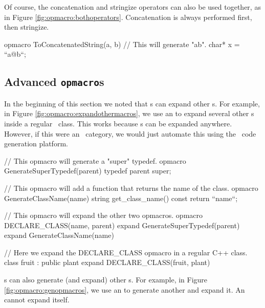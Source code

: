 {Of course, the concatenation and stringize operators can also be used together, as in Figure \ref{fig:opmacro:bothoperators}.  Concatenation is always performed first, then stringize.

\begin{opcpp}[label={fig:opmacro:bothoperators},caption={Using the concatenation and stringize operators together.}]
opmacro ToConcatenatedString(a, b)
{
    // This will generate "ab".    
    char* x = ``a@b``;
}
\end{opcpp}

\subsection{Advanced {\tt opmacro}s}
\label{subsec:advancedopmacros}

In the beginning of this section we noted that s can expand other s.  For example, in Figure \ref{fig:opmacro:expandothermacros}, we use an  to expand several other s inside a regular \cpp\ class.  This works because s can be expanded anywhere.  However, if this were an \opCPP\ category, we would just automate this using the \opCPP\ code generation platform.

\begin{opcpp}[label={fig:opmacro:expandothermacros},caption={Using an \opcppk{opmacro} to expand other \opcppk{opmacro}s.}]
// This opmacro will generate a "super" typedef.
opmacro GenerateSuperTypedef(parent)
{
    typedef parent super;
}

// This opmacro will add a function that returns the name of the class.
opmacro GenerateClassName(name)
{
    string get_class_name() const
    {
        return ``name``;
    }
}

// This opmacro will expand the other two opmacros.
opmacro DECLARE_CLASS(name, parent)
{
    expand GenerateSuperTypedef(parent)
    expand GenerateClassName(name)
}

// Here we expand the DECLARE_CLASS opmacro in a regular C++ class.
class fruit : public plant
{
    expand DECLARE_CLASS(fruit, plant)
} 
\end{opcpp}

s can also generate (and expand) other s.  For example, in Figure \ref{fig:opmacro:genopmacros}, we use an  to generate another  and expand it.  An  cannot expand itself.

}
